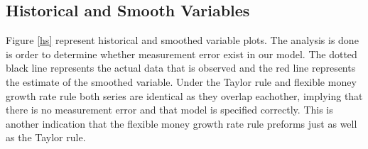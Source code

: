 \documentclass[11pt,preprint, authoryear]{elsarticle}
\numberwithin{equation}{section}
\numberwithin{figure}{section}
\numberwithin{table}{section}
\begin{document}
\hypertarget{historical-and-smooth-variables}{%
\subsection{Historical and Smooth
Variables}\label{historical-and-smooth-variables}}

Figure \ref{hs} represent historical and smoothed variable plots. The
analysis is done is order to determine whether measurement error exist
in our model. The dotted black line represents the actual data that is
observed and the red line represents the estimate of the smoothed
variable. Under the Taylor rule and flexible money growth rate rule both
series are identical as they overlap eachother, implying that there is
no measurement error and that model is specified correctly. This is
another indication that the flexible money growth rate rule preforms
just as well as the Taylor rule.
\end{document}
